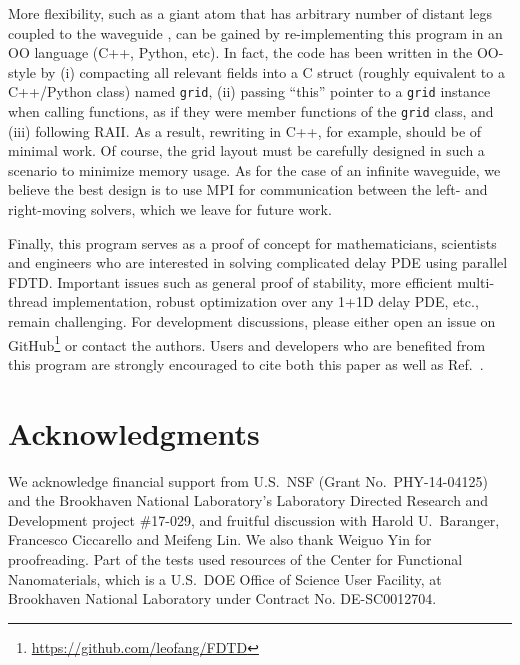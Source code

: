 \documentclass[final,1p,times]{elsarticle}
\begin{document}
More flexibility, such as a giant atom that has arbitrary number of distant legs coupled to the waveguide \cite{GustafssonSci14,FriskKockumPRA14,GuoPRA17}, can be gained by re-implementing this program in an OO language (C++, Python, etc). In fact, the code has been written in the OO-style by (i) compacting all relevant fields into a C struct (roughly equivalent to a C++/Python class) named \texttt{grid}, (ii) passing ``this'' pointer to a \texttt{grid} instance when calling functions, as if they were member functions of the \texttt{grid} class, and (iii) following RAII. As a result, rewriting in C++, for example, should be of minimal work. Of course, the grid layout must be carefully designed in such a scenario to minimize memory usage.
As for the case of an infinite waveguide, we believe the best design is to use MPI for communication between the left- and right-moving solvers, which we leave for future work.

Finally, this program serves as a proof of concept for mathematicians, scientists and engineers who are interested in solving complicated delay PDE using parallel FDTD. Important issues such as general proof of stability, more efficient multi-thread implementation, robust optimization over any 1+1D delay PDE, etc., remain challenging. For development discussions, please either open an issue on GitHub\footnote{\url{https://github.com/leofang/FDTD}} or contact the authors. Users and developers who are benefited from this program are strongly encouraged to cite both this paper as well as Ref.~\cite{FangNJP18}.

\section{Acknowledgments}
We acknowledge financial support from U.S.\ NSF (Grant No.\ PHY-14-04125) and the Brookhaven National Laboratory's Laboratory Directed Research and Development project \#17-029, and fruitful discussion with Harold U.\ Baranger, Francesco Ciccarello and Meifeng Lin. We also thank Weiguo Yin for proofreading.
Part of the tests used resources of the Center for Functional Nanomaterials, which is a U.S.\ DOE Office of Science User Facility, at Brookhaven National Laboratory under Contract No. DE-SC0012704.
\end{document}
